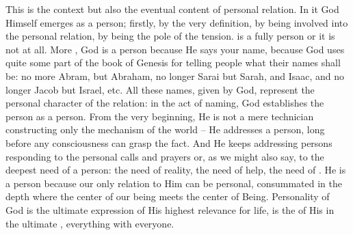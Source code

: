 This  is the context but also the eventual content of personal
relation.  In it God Himself emerges as a person; firstly, by the very
definition, by being involved into the personal relation, by being the
 pole of the  tension.  is a fully
 person or it is not at all. More , God is a person
because He says your name, because  God uses quite some part of the book of Genesis for
telling people what their names shall be: no more Abram, but Abraham, no longer
Sarai but Sarah, and Isaac, and no longer Jacob but Israel, etc.
%
All these names, given by God, represent the personal character of the relation:
in the act of naming, God establishes the person as a person.  From the very
beginning, He is not a mere technician constructing only the mechanism of the
world -- He addresses a person, long before any consciousness can 
grasp the fact.   And He keeps addressing persons responding to the personal
calls and prayers or, as we might also say, to the deepest need of a person: the
need of reality, the need of help, the need of . He is a person
because our only relation to Him can be personal, consummated in the depth where
the center of our being meets the center of Being. Personality of God is the
ultimate expression of His highest relevance for life, is the  of
His  in the ultimate ,  everything with everyone.

